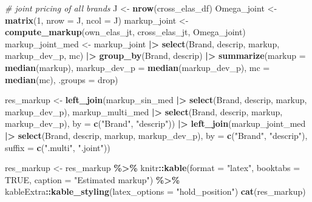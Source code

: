 \documentclass[
]{article}
\newenvironment{Shaded}{\begin{snugshade}}{\end{snugshade}}
\newcommand{\AttributeTok}[1]{\textcolor[rgb]{0.13,0.29,0.53}{#1}}
\newcommand{\CommentTok}[1]{\textcolor[rgb]{0.56,0.35,0.01}{\textit{#1}}}
\newcommand{\ConstantTok}[1]{\textcolor[rgb]{0.56,0.35,0.01}{#1}}
\newcommand{\DecValTok}[1]{\textcolor[rgb]{0.00,0.00,0.81}{#1}}
\newcommand{\FunctionTok}[1]{\textcolor[rgb]{0.13,0.29,0.53}{\textbf{#1}}}
\newcommand{\NormalTok}[1]{#1}
\newcommand{\OtherTok}[1]{\textcolor[rgb]{0.56,0.35,0.01}{#1}}
\newcommand{\SpecialCharTok}[1]{\textcolor[rgb]{0.81,0.36,0.00}{\textbf{#1}}}
\newcommand{\StringTok}[1]{\textcolor[rgb]{0.31,0.60,0.02}{#1}}
\begin{document}
\begin{Shaded}
\begin{Highlighting}[]
\CommentTok{\# joint pricing of all brands}
\NormalTok{J }\OtherTok{\textless{}{-}} \FunctionTok{nrow}\NormalTok{(cross\_elas\_df)}
\NormalTok{Omega\_joint }\OtherTok{\textless{}{-}} \FunctionTok{matrix}\NormalTok{(}\DecValTok{1}\NormalTok{, }\AttributeTok{nrow =}\NormalTok{ J, }\AttributeTok{ncol =}\NormalTok{ J)}
\NormalTok{markup\_joint }\OtherTok{\textless{}{-}} \FunctionTok{compute\_markup}\NormalTok{(own\_elas\_jt, cross\_elas\_jt, Omega\_joint)}
\NormalTok{markup\_joint\_med }\OtherTok{\textless{}{-}}\NormalTok{ markup\_joint }\SpecialCharTok{|\textgreater{}}
  \FunctionTok{select}\NormalTok{(Brand, descrip, markup, markup\_dev\_p, mc) }\SpecialCharTok{|\textgreater{}}
  \FunctionTok{group\_by}\NormalTok{(Brand, descrip) }\SpecialCharTok{|\textgreater{}}
  \FunctionTok{summarize}\NormalTok{(}\AttributeTok{markup =} \FunctionTok{median}\NormalTok{(markup), }\AttributeTok{markup\_dev\_p =} \FunctionTok{median}\NormalTok{(markup\_dev\_p), }
            \AttributeTok{mc =} \FunctionTok{median}\NormalTok{(mc), }\AttributeTok{.groups =} \StringTok{\textquotesingle{}drop\textquotesingle{}}\NormalTok{)}

\NormalTok{res\_markup }\OtherTok{\textless{}{-}} \FunctionTok{left\_join}\NormalTok{(markup\_sin\_med }\SpecialCharTok{|\textgreater{}} \FunctionTok{select}\NormalTok{(Brand, descrip, markup, markup\_dev\_p),}
\NormalTok{                        markup\_multi\_med }\SpecialCharTok{|\textgreater{}} \FunctionTok{select}\NormalTok{(Brand, descrip, markup, markup\_dev\_p),}
                        \AttributeTok{by =} \FunctionTok{c}\NormalTok{(}\StringTok{"Brand"}\NormalTok{, }\StringTok{"descrip"}\NormalTok{)) }\SpecialCharTok{|\textgreater{}}
                \FunctionTok{left\_join}\NormalTok{(markup\_joint\_med }\SpecialCharTok{|\textgreater{}} \FunctionTok{select}\NormalTok{(Brand, descrip, markup, markup\_dev\_p),}
                          \AttributeTok{by =} \FunctionTok{c}\NormalTok{(}\StringTok{"Brand"}\NormalTok{, }\StringTok{"descrip"}\NormalTok{), }\AttributeTok{suffix =} \FunctionTok{c}\NormalTok{(}\StringTok{".multi"}\NormalTok{, }\StringTok{".joint"}\NormalTok{))}

\NormalTok{res\_markup }\OtherTok{\textless{}{-}}\NormalTok{ res\_markup }\SpecialCharTok{\%\textgreater{}\%}
\NormalTok{  knitr}\SpecialCharTok{::}\FunctionTok{kable}\NormalTok{(}\AttributeTok{format =} \StringTok{"latex"}\NormalTok{, }\AttributeTok{booktabs =} \ConstantTok{TRUE}\NormalTok{, }\AttributeTok{caption =} \StringTok{"Estimated markup"}\NormalTok{) }\SpecialCharTok{\%\textgreater{}\%}
\NormalTok{  kableExtra}\SpecialCharTok{::}\FunctionTok{kable\_styling}\NormalTok{(}\AttributeTok{latex\_options =} \StringTok{"hold\_position"}\NormalTok{)}
\FunctionTok{cat}\NormalTok{(res\_markup)}
\end{Highlighting}
\end{Shaded}
\end{document}
